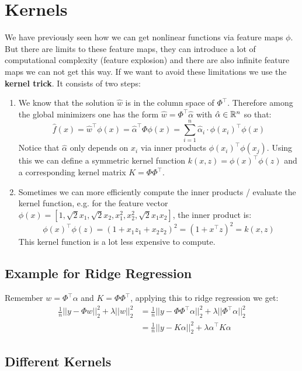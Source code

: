 \section{Kernels}

We have previously seen how we can get nonlinear functions via feature maps $\phi$. But there are limits to these feature maps, they can introduce a lot of computational complexity (feature explosion) and there are also infinite feature maps we can not get this way. If we want to avoid these limitations we use the \textbf{kernel trick}. It consists of two steps:

\begin{enumerate}
	\item We know that the solution $\hat{w}$ is in the column space of $\Phi^\top$. Therefore among the global minimizers one has the form $\hat{w} = \Phi^\top \hat{\alpha}$ with $\hat{\alpha} \in \mathbb{R}^n$ so that:
		$$\hat{f}(x) = \hat{w}^\top \phi(x) = \hat{\alpha}^\top \Phi \phi(x) = \sum_{i=1}^n \hat{\alpha}_i \cdot \phi(x_i)^\top \phi(x)$$
		Notice that $\hat{\alpha}$ only depends on $x_i$ via inner products $\phi(x_i)^\top \phi(x_j)$. Using this we can define a symmetric kernel function $k(x,z) = \phi(x)^\top \phi(z)$ and a corresponding kernel matrix $K = \Phi \Phi^\top$.
	\item Sometimes we can more efficiently compute the inner products / evaluate the kernel function, e.g. for the feature vector $\phi(x) = [1, \sqrt{2}x_1, \sqrt{2}x_2, x_1^2, x_2^2, \sqrt{2}x_1x_2]$, the inner product is:
		$$\phi(x)^\top \phi(z) = (1 + x_1 z_1 + x_2 z_2)^2 = (1 + x^\top z)^2 = k(x,z)$$
		This kernel function is a lot less expensive to compute.
\end{enumerate}

\subsection{Example for Ridge Regression}

Remember $w = \Phi^\top \alpha$ and $K = \Phi \Phi^\top$, applying this to ridge regression we get:
\begin{align*}
	\frac{1}{n} ||y - \Phi w||_2^2 + \lambda ||w||_2^2 &= \frac{1}{n} ||y - \Phi \Phi^\top \alpha||_2^2 + \lambda ||\Phi^\top \alpha||_2^2 \\
	&= \frac{1}{n} ||y - K\alpha ||_2^2 + \lambda \alpha^\top K \alpha
\end{align*}

\subsection{Different Kernels}

